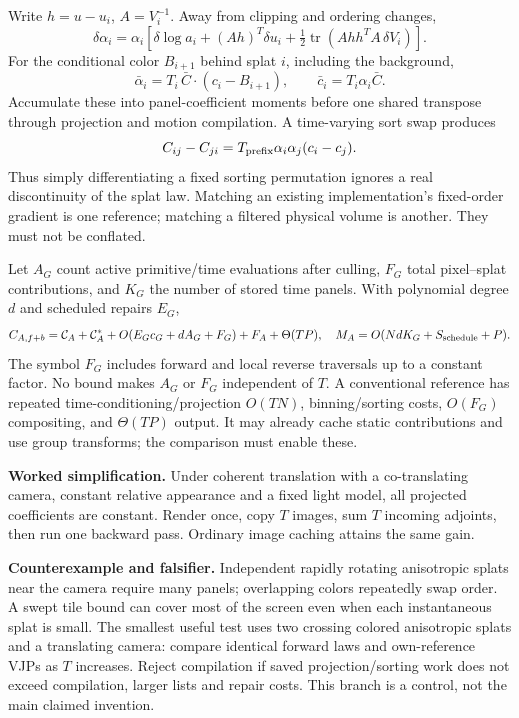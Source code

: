 \documentclass[10pt,letterpaper]{article}
\theoremstyle{remark}\newtheorem{counterexample}[proposition]{Counterexample}
\newcommand{\tr}{\operatorname{tr}}
\newcommand{\status}[1]{\textbf{#1.}}
\newcommand{\cost}{\mathcal C}
\begin{document}
Write $h=u-u_i$, $A=V_i^{-1}$. Away from clipping and ordering changes,
\begin{equation}
 \delta\alpha_i=\alpha_i\left[\delta\log a_i+(Ah)^T\delta u_i+
 \tfrac12\tr(Ahh^TA\,\delta V_i)\right]. \label{eq:gaussgrad}
\end{equation}
For the conditional color $B_{i+1}$ behind splat $i$, including the background,
\begin{equation}
 \bar\alpha_i=T_i\,\bar C\cdot(c_i-B_{i+1}),\qquad
 \bar c_i=T_i\alpha_i\bar C.
\end{equation}
Accumulate these into panel-coefficient moments before one shared transpose through projection and motion compilation. A time-varying sort swap produces
\begin{equation}
 C_{ij}-C_{ji}=T_{\rm prefix}\alpha_i\alpha_j(c_i-c_j).
\end{equation}
Thus simply differentiating a fixed sorting permutation ignores a real discontinuity of the splat law. Matching an existing implementation's fixed-order gradient is one reference; matching a filtered physical volume is another. They must not be conflated.

Let $A_G$ count active primitive/time evaluations after culling, $F_G$ total pixel--splat contributions, and $K_G$ the number of stored time panels. With polynomial degree $d$ and scheduled repairs $E_G$,
\begin{equation}
 C_{A,f+b}=\cost_A+\cost_A^*+O(E_Gc_G+dA_G+F_G)+F_A+\Theta(TP),\quad
 M_A=O(NdK_G+S_{\rm schedule}+P).
 \label{eq:costA}
\end{equation}
The symbol $F_G$ includes forward and local reverse traversals up to a constant factor. No bound makes $A_G$ or $F_G$ independent of $T$. A conventional reference has repeated time-conditioning/projection $O(TN)$, binning/sorting costs, $O(F_G)$ compositing, and $\Theta(TP)$ output. It may already cache static contributions and use group transforms; the comparison must enable these.

\status{Worked simplification} Under coherent translation with a co-translating camera, constant relative appearance and a fixed light model, all projected coefficients are constant. Render once, copy $T$ images, sum $T$ incoming adjoints, then run one backward pass. Ordinary image caching attains the same gain.

\status{Counterexample and falsifier} Independent rapidly rotating anisotropic splats near the camera require many panels; overlapping colors repeatedly swap order. A swept tile bound can cover most of the screen even when each instantaneous splat is small. The smallest useful test uses two crossing colored anisotropic splats and a translating camera: compare identical forward laws and own-reference VJPs as $T$ increases. Reject compilation if saved projection/sorting work does not exceed compilation, larger lists and repair costs. This branch is a control, not the main claimed invention.
\end{document}
